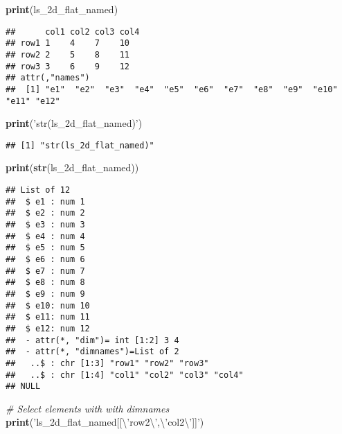 \documentclass[
]{book}
\newenvironment{Shaded}{\begin{snugshade}}{\end{snugshade}}
\newcommand{\CharTok}[1]{\textcolor[rgb]{0.31,0.60,0.02}{#1}}
\newcommand{\CommentTok}[1]{\textcolor[rgb]{0.56,0.35,0.01}{\textit{#1}}}
\newcommand{\KeywordTok}[1]{\textcolor[rgb]{0.13,0.29,0.53}{\textbf{#1}}}
\newcommand{\NormalTok}[1]{#1}
\newcommand{\StringTok}[1]{\textcolor[rgb]{0.31,0.60,0.02}{#1}}
\begin{document}
\begin{Shaded}
\begin{Highlighting}[]
\KeywordTok{print}\NormalTok{(ls_2d_flat_named)}
\end{Highlighting}
\end{Shaded}

\begin{verbatim}
##      col1 col2 col3 col4
## row1 1    4    7    10  
## row2 2    5    8    11  
## row3 3    6    9    12  
## attr(,"names")
##  [1] "e1"  "e2"  "e3"  "e4"  "e5"  "e6"  "e7"  "e8"  "e9"  "e10" "e11" "e12"
\end{verbatim}

\begin{Shaded}
\begin{Highlighting}[]
\KeywordTok{print}\NormalTok{(}\StringTok{'str(ls_2d_flat_named)'}\NormalTok{)}
\end{Highlighting}
\end{Shaded}

\begin{verbatim}
## [1] "str(ls_2d_flat_named)"
\end{verbatim}

\begin{Shaded}
\begin{Highlighting}[]
\KeywordTok{print}\NormalTok{(}\KeywordTok{str}\NormalTok{(ls_2d_flat_named))}
\end{Highlighting}
\end{Shaded}

\begin{verbatim}
## List of 12
##  $ e1 : num 1
##  $ e2 : num 2
##  $ e3 : num 3
##  $ e4 : num 4
##  $ e5 : num 5
##  $ e6 : num 6
##  $ e7 : num 7
##  $ e8 : num 8
##  $ e9 : num 9
##  $ e10: num 10
##  $ e11: num 11
##  $ e12: num 12
##  - attr(*, "dim")= int [1:2] 3 4
##  - attr(*, "dimnames")=List of 2
##   ..$ : chr [1:3] "row1" "row2" "row3"
##   ..$ : chr [1:4] "col1" "col2" "col3" "col4"
## NULL
\end{verbatim}

\begin{Shaded}
\begin{Highlighting}[]
\CommentTok{# Select elements with with dimnames}
\KeywordTok{print}\NormalTok{(}\StringTok{'ls_2d_flat_named[[}\CharTok{\textbackslash{}'}\StringTok{row2}\CharTok{\textbackslash{}'}\StringTok{,}\CharTok{\textbackslash{}'}\StringTok{col2}\CharTok{\textbackslash{}'}\StringTok{]]'}\NormalTok{)}
\end{Highlighting}
\end{Shaded}
\end{document}
